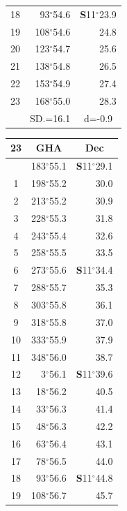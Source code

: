 \documentclass[10pt, a4paper]{report}
\begin{document}
\begin{scriptsize}
\begin{tabular*}{0.2\textwidth}[t]{@{\extracolsep{\fill}}|c|rr|}
18 & 93$^\circ$54.6 & \textbf{S}11$^\circ$23.9\\
19 & 108$^\circ$54.6 & 24.8\\
20 & 123$^\circ$54.7 & 25.6\\
21 & 138$^\circ$54.8 & \raisebox{0.24ex}{\boldmath$\cdot$~\boldmath$\cdot$~~}26.5\\
22 & 153$^\circ$54.9 & 27.4\\
23 & 168$^\circ$55.0 & 28.3\\
\hline
\rule{0pt}{2.4ex} & \multicolumn{1}{c}{SD.=16.1} & \multicolumn{1}{c|}{d=-0.9}\\
\hline
\end{tabular*}\noindent
\begin{tabular*}{0.2\textwidth}[t]{@{\extracolsep{\fill}}|c|rr|}
\hline
\multicolumn{1}{|c|}{\rule{0pt}{2.6ex}\textbf{23}} & \multicolumn{1}{c}{\textbf{GHA}} & \multicolumn{1}{c|}{\textbf{Dec}}\\
\hline\rule{0pt}{2.6ex}\noindent
0 & 183$^\circ$55.1 & \textbf{S}11$^\circ$29.1\\
1 & 198$^\circ$55.2 & 30.0\\
2 & 213$^\circ$55.2 & 30.9\\
3 & 228$^\circ$55.3 & \raisebox{0.24ex}{\boldmath$\cdot$~\boldmath$\cdot$~~}31.8\\
4 & 243$^\circ$55.4 & 32.6\\
5 & 258$^\circ$55.5 & 33.5\\[2Pt]
6 & 273$^\circ$55.6 & \textbf{S}11$^\circ$34.4\\
7 & 288$^\circ$55.7 & 35.3\\
8 & 303$^\circ$55.8 & 36.1\\
9 & 318$^\circ$55.8 & \raisebox{0.24ex}{\boldmath$\cdot$~\boldmath$\cdot$~~}37.0\\
10 & 333$^\circ$55.9 & 37.9\\
11 & 348$^\circ$56.0 & 38.7\\[2Pt]
12 & 3$^\circ$56.1 & \textbf{S}11$^\circ$39.6\\
13 & 18$^\circ$56.2 & 40.5\\
14 & 33$^\circ$56.3 & 41.4\\
15 & 48$^\circ$56.3 & \raisebox{0.24ex}{\boldmath$\cdot$~\boldmath$\cdot$~~}42.2\\
16 & 63$^\circ$56.4 & 43.1\\
17 & 78$^\circ$56.5 & 44.0\\[2Pt]
18 & 93$^\circ$56.6 & \textbf{S}11$^\circ$44.8\\
19 & 108$^\circ$56.7 & 45.7\\

\end{tabular*}
\end{scriptsize}
\end{document}
